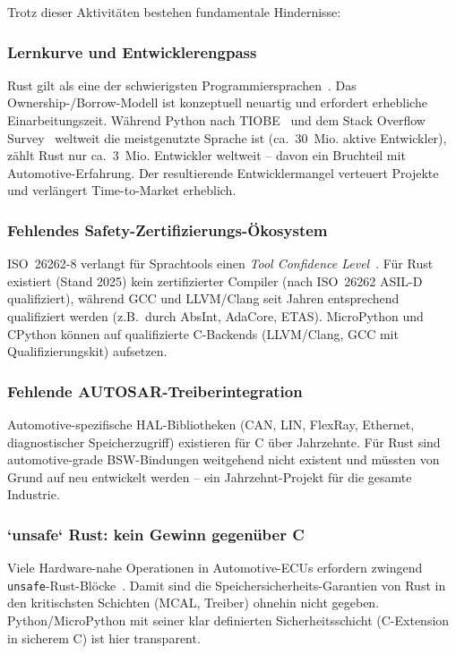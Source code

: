 ﻿\documentclass[12pt,a4paper,twoside]{article}
\begin{document}
Trotz dieser Aktivitäten bestehen fundamentale Hindernisse:

\subsubsection{Lernkurve und Entwicklerengpass}
Rust gilt als eine der schwierigsten Programmiersprachen~\cite{stackoverflow_survey2024}.
Das Ownership-/Borrow-Modell ist konzeptuell neuartig und erfordert
erhebliche Einarbeitungszeit.
Während Python nach TIOBE~\cite{tiobe2025} und dem
Stack Overflow Survey~\cite{stackoverflow_survey2024} weltweit die
meistgenutzte Sprache ist (ca.\ 30~Mio. aktive Entwickler), zählt
Rust nur ca.\ 3~Mio. Entwickler weltweit -- davon ein Bruchteil
mit Automotive-Erfahrung. Der resultierende Entwicklermangel
verteuert Projekte und verlängert Time-to-Market erheblich.

\subsubsection{Fehlendes Safety-Zertifizierungs-Ökosystem}
ISO~26262-8 verlangt für Sprachtools einen
\emph{Tool Confidence Level}~\cite{iso26262_2018}.
Für Rust existiert (Stand 2025) kein zertifizierter Compiler
(nach ISO~26262 ASIL-D qualifiziert), während GCC und LLVM/Clang
seit Jahren entsprechend qualifiziert werden (z.B.\ durch
AbsInt, AdaCore, ETAS).
MicroPython und CPython können auf qualifizierte C-Backends
(LLVM/Clang, GCC mit Qualifizierungskit) aufsetzen.

\subsubsection{Fehlende AUTOSAR-Treiberintegration}
Automotive-spezifische HAL-Bibliotheken (CAN, LIN, FlexRay, Ethernet,
diagnostischer Speicherzugriff) existieren für C über Jahrzehnte.
Für Rust sind automotive-grade BSW-Bindungen weitgehend nicht existent
und müssten von Grund auf neu entwickelt werden -- ein
Jahrzehnt-Projekt für die gesamte Industrie.

\subsubsection{`unsafe` Rust: kein Gewinn gegenüber C}
Viele Hardware-nahe Operationen in Automotive-ECUs erfordern
zwingend \texttt{unsafe}-Rust-Blöcke~\cite{rust_unsafe2021}.
Damit sind die Speichersicherheits-Garantien von Rust in den
kritischsten Schichten (MCAL, Treiber) ohnehin nicht gegeben.
Python/MicroPython mit seiner klar definierten Sicherheitsschicht
(C-Extension in sicherem C) ist hier transparent.
\end{document}
